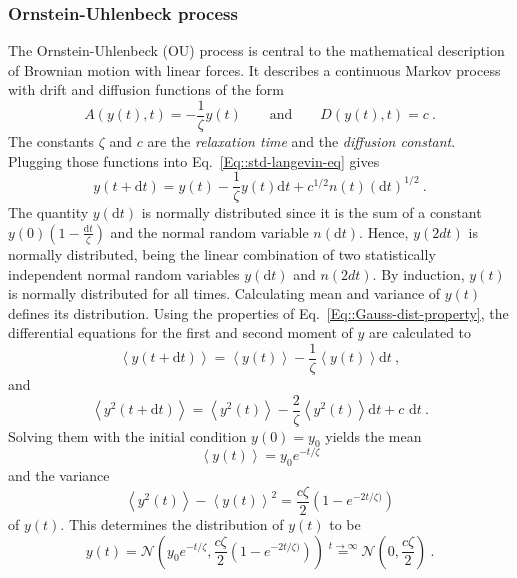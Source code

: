 	\subsubsection{Ornstein-Uhlenbeck process}
	The Ornstein-Uhlenbeck (OU) process is central to the mathematical description of Brownian motion with linear forces. It describes a continuous Markov process with drift and diffusion functions of the form
	\begin{equation}
		A(y(t), t) =	- \frac{1}{\zeta} y(t) \qquad \text{and} \qquad D(y(t), t) =	c~.
	\end{equation}
	The constants $\zeta$ and $c$ are the \textit{relaxation time} and the \textit{diffusion constant}. Plugging those functions into Eq.~\eqref{Eq::std-langevin-eq} gives
	\begin{equation}\label{Eq::OU-Langevin}
		y(t + \text{d}t) =	y(t) - \frac{1}{\zeta} y(t) \text{d}t + c^{1/2} n(t) (\text{d}t)^{1/2}~.
	\end{equation}
	The quantity $y(\text{d}t)$ is normally distributed since it is the sum of a constant $y(0) (1 - \frac{\text{d}t}{\zeta})$ and the normal random variable $n(\text{d}t)$. Hence, $y(2dt)$ is normally distributed, being the linear combination of two statistically independent normal random variables $y(\text{d}t)$ and $n(2dt)$. By induction, $y(t)$ is normally distributed for all times. Calculating mean and variance of $y(t)$ defines its distribution.
	Using the properties of Eq.~\eqref{Eq::Gauss-dist-property}, the differential equations for the first and second moment of $y$ are calculated to
	\begin{equation}
		\left \langle y(t + \text{d}t) \right \rangle =	\left \langle y(t) \right \rangle - \frac{1}{\zeta} \left \langle y(t) \right \rangle \text{d}t~,
	\end{equation}
	and
	\begin{equation}
		\left \langle y^2(t + \text{d}t) \right \rangle =	\left \langle y^2(t) \right \rangle - \frac{2}{\zeta} \left \langle y^2(t) \right \rangle \text{d}t  + c \text{ d}t~.
	\end{equation}
	Solving them with the initial condition $y(0) =	y_0$ yields the mean
	\begin{equation}
		\left \langle y(t) \right \rangle =	 y_0 e^{-t/\zeta}
	\end{equation}
	and the variance
	\begin{equation}
		\left \langle y^2(t) \right \rangle - \left \langle y(t) \right \rangle^2 =	\frac{c\zeta}{2} \left(1 - e^{-2t /	\zeta)}\right)
	\end{equation}
	of $y(t)$. This determines the distribution of $y(t)$ to be
	\begin{equation} \label{Eq::OU-Distribution}
		y(t) =	\mathcal{N}\left(y_0 e^{-t/\zeta}, \frac{c\zeta}{2} \left(1 - e^{-2t /	\zeta)}\right)\right) \overset{t \rightarrow \infty}{=} \mathcal{N}\left(0 , \frac{c\zeta}{2}\right) ~.
	\end{equation}
